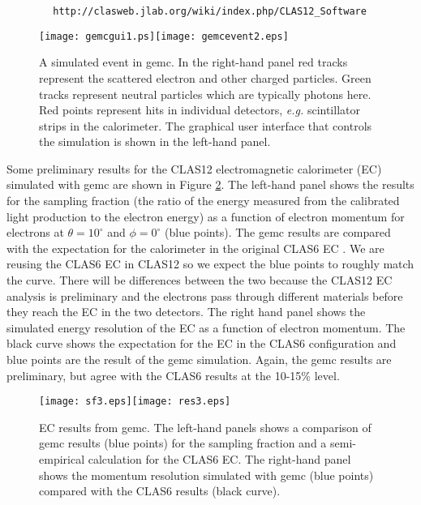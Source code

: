 \begin{verbatim}
        http://clasweb.jlab.org/wiki/index.php/CLAS12_Software
\end{verbatim}

\begin{figure}[htb]
\begin{center}
\texttt{[image: gemcgui1.ps]}\hspace{0.2in}\texttt{[image: gemcevent2.eps]}
\caption{A simulated event in gemc. In the right-hand panel red tracks represent the scattered electron and other charged particles. Green tracks represent
neutral particles which are typically photons here. Red points represent hits in individual detectors, {\it e.g.} scintillator 
strips in the calorimeter. The graphical user interface that controls the simulation is shown in the left-hand panel.}\label{gemcevent1}
\end{center}
\end{figure}

Some preliminary results for the CLAS12 electromagnetic calorimeter (EC) simulated with gemc are shown in Figure \ref{gemcECresults}.
The left-hand panel shows the results for the sampling fraction (the ratio of the energy measured from the calibrated light production to the electron energy) as a function 
of electron momentum for 
electrons at  $\theta = 10^\circ$ and $\phi = 0^\circ$ (blue points).
The gemc results are compared with the expectation for the calorimeter in the original CLAS6 EC \cite{ref:ECnim}. We are reusing the CLAS6 EC in CLAS12 so we expect the blue points to
roughly match the curve. There will be differences between the two because the CLAS12 EC analysis is preliminary and the electrons pass through different
materials before they reach the EC in the two detectors.
The right hand panel shows the simulated energy resolution of the EC as a function of electron momentum. 
The black curve shows the expectation for the EC in the CLAS6 configuration
and blue points are the result of the gemc simulation.
Again, the gemc results are preliminary, but agree with the CLAS6 results at the 10-15\% level.
\begin{figure}[htb]
\begin{center}
\texttt{[image: sf3.eps]}\hspace{0.2in}\texttt{[image: res3.eps]}
\caption{EC results from gemc. The left-hand panels shows a comparison of gemc results (blue points) for the sampling fraction and a semi-empirical calculation for the CLAS6 EC.
The right-hand panel shows the momentum resolution simulated with gemc (blue points) compared with the CLAS6 results (black curve). }\label{gemcECresults}
\end{center}
\end{figure}



